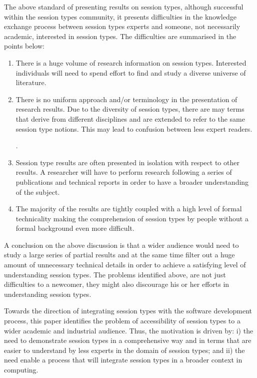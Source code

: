 The above standard of presenting results on session types,
although successful within the session types community,
it presents difficulties in the knowledge exchange process between 
session types experts and someone, not necessarily academic, interested
in session types. The difficulties are summarised in the points
below:
%
\begin{enumerate}
	\item	There is a huge volume of research information on session types.
			Interested individuals will need to spend effort to find
			and study a diverse universe of literature.

	\item	There is no uniform approach and/or terminology
			in the presentation of research results.
			Due to the diversity of session types,
			there are may terms that derive from different
			disciplines and are extended to refer to
			the same session type notions.
			This may lead to confusion between less
			expert readers.

			.

	\item	Session type results are often presented in
			isolation with respect to other results.
			A researcher will have to perform research
			following a series of publications and
			technical reports in order to have a broader
			understanding of the subject.

	\item	The majority of the results are tightly coupled
			with a high level of formal technicality making the
			comprehension of session types by people without
			a formal background even more difficult.
\end{enumerate}
%
A conclusion on the above discussion is that a wider
audience would need to study a large series of partial
results and at the same time filter out a huge amount
of unnecessary technical details in order to achieve a satisfying
level of understanding session types.
The problems identified above, are not just difficulties
to a newcomer, they might also discourage his or her
efforts in understanding session types.

Towards the direction of integrating session types with
the software development process, this paper identifies the problem of accessibility
of session types to a wider academic and industrial audience. 
Thus, the motivation is driven by:
i) the need to demonstrate session types in a comprehensive way and in
terms that are easier to understand by less experts in the domain of
session types; and ii) the need enable a process that will
integrate session types in a broader context in computing.

